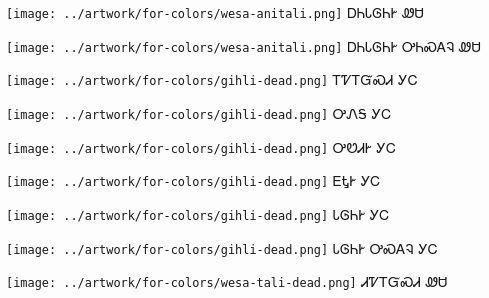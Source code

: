 \documentclass[avery5371,frame]{flashcards}%
\begin{document}
\begin{flashcard}{
\texttt{[image: ../artwork/for-colors/wesa-anitali.png]}
}
\Huge ᎠᏂᏓᎶᏂᎨ ᏪᏌ
\end{flashcard}

\begin{flashcard}{
\texttt{[image: ../artwork/for-colors/wesa-anitali.png]}
}
\Huge ᎠᏂᏓᎶᏂᎨ ᎤᏂᏍᎪᎸ ᏪᏌ
\end{flashcard}

\begin{flashcard}{
\texttt{[image: ../artwork/for-colors/gihli-dead.png]}
}
\Huge ᎢᏤᎢᏳᏍᏗ ᎩᏟ
\end{flashcard}

\begin{flashcard}{
\texttt{[image: ../artwork/for-colors/gihli-dead.png]}
}
\Huge ᎤᏁᎦ ᎩᏟ
\end{flashcard}

\begin{flashcard}{
\texttt{[image: ../artwork/for-colors/gihli-dead.png]}
}
\Huge ᎤᏬᏗᎨ ᎩᏟ
\end{flashcard}

\begin{flashcard}{
\texttt{[image: ../artwork/for-colors/gihli-dead.png]}
}
\Huge ᎬᎿᎨ ᎩᏟ
\end{flashcard}

\begin{flashcard}{
\texttt{[image: ../artwork/for-colors/gihli-dead.png]}
}
\Huge ᏓᎶᏂᎨ ᎩᏟ
\end{flashcard}

\begin{flashcard}{
\texttt{[image: ../artwork/for-colors/gihli-dead.png]}
}
\Huge ᏓᎶᏂᎨ ᎤᏍᎪᎸ ᎩᏟ
\end{flashcard}


\begin{flashcard}{
\texttt{[image: ../artwork/for-colors/wesa-tali-dead.png]}
}
\Huge ᏗᏤᎢᏳᏍᏗ ᏪᏌ
\end{flashcard}
\end{document}
